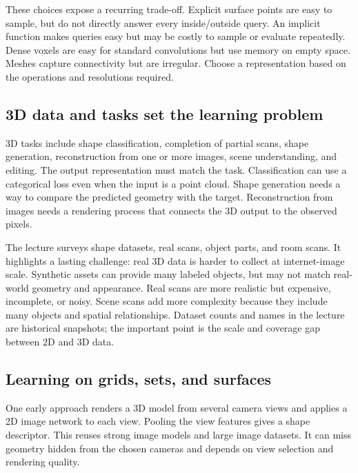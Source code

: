 These choices expose a recurring trade-off. Explicit surface points are easy to sample, but do not directly answer every inside/outside query. An implicit function makes queries easy but may be costly to sample or evaluate repeatedly. Dense voxels are easy for standard convolutions but use memory on empty space. Meshes capture connectivity but are irregular. Choose a representation based on the operations and resolutions required.

\subsection{3D data and tasks set the learning problem}\label{04-visual-computing-ii-ch034-d-data-and-tasks-set-the-learning-problem}

\hypertarget{04-visual-computing-ii-ch034-d-data-and-tasks-set-the-learning-problem}{}

3D tasks include shape classification, completion of partial scans, shape generation, reconstruction from one or more images, scene understanding, and editing. The output representation must match the task. Classification can use a categorical loss even when the input is a point cloud. Shape generation needs a way to compare the predicted geometry with the target. Reconstruction from images needs a rendering process that connects the 3D output to the observed pixels.

The lecture surveys shape datasets, real scans, object parts, and room scans. It highlights a lasting challenge: real 3D data is harder to collect at internet-image scale. Synthetic assets can provide many labeled objects, but may not match real-world geometry and appearance. Real scans are more realistic but expensive, incomplete, or noisy. Scene scans add more complexity because they include many objects and spatial relationships. Dataset counts and names in the lecture are historical snapshots; the important point is the scale and coverage gap between 2D and 3D data.

\subsection{Learning on grids, sets, and surfaces}\label{04-visual-computing-ii-ch034-learning-on-grids-sets-and-surfaces}

\hypertarget{04-visual-computing-ii-ch034-learning-on-grids-sets-and-surfaces}{}

One early approach renders a 3D model from several camera views and applies a 2D image network to each view. Pooling the view features gives a shape descriptor. This reuses strong image models and large image datasets. It can miss geometry hidden from the chosen cameras and depends on view selection and rendering quality.

